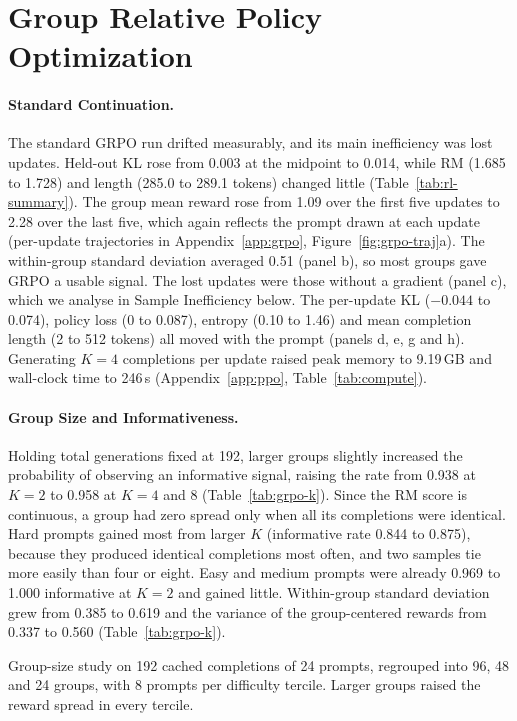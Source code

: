 \documentclass{article}
\newcommand{\tablebody}[1]{\small\setlength{\tabcolsep}{4pt}\begin{adjustbox}{max width=\linewidth}\end{adjustbox}}
\begin{document}
\section{Group Relative Policy Optimization}
\label{sec:grpo}

\paragraph{Standard Continuation.} The standard GRPO run drifted measurably, and its main inefficiency was lost updates. Held-out KL rose from 0.003 at the midpoint to 0.014, while RM (1.685 to 1.728) and length (285.0 to 289.1 tokens) changed little (Table~\ref{tab:rl-summary}). The group mean reward rose from 1.09 over the first five updates to 2.28 over the last five, which again reflects the prompt drawn at each update (per-update trajectories in Appendix~\ref{app:grpo}, Figure~\ref{fig:grpo-traj}a). The within-group standard deviation averaged 0.51 (panel b), so most groups gave GRPO a usable signal. The lost updates were those without a gradient (panel c), which we analyse in Sample Inefficiency below. The per-update KL ($-0.044$ to 0.074), policy loss (0 to 0.087), entropy (0.10 to 1.46) and mean completion length (2 to 512 tokens) all moved with the prompt (panels d, e, g and h). Generating $K = 4$ completions per update raised peak memory to 9.19\,GB and wall-clock time to 246\,s (Appendix~\ref{app:ppo}, Table~\ref{tab:compute}).

\paragraph{Group Size and Informativeness.} Holding total generations fixed at 192, larger groups slightly increased the probability of observing an informative signal, raising the rate from 0.938 at $K = 2$ to 0.958 at $K = 4$ and 8 (Table~\ref{tab:grpo-k}). Since the RM score is continuous, a group had zero spread only when all its completions were identical. Hard prompts gained most from larger $K$ (informative rate 0.844 to 0.875), because they produced identical completions most often, and two samples tie more easily than four or eight. Easy and medium prompts were already 0.969 to 1.000 informative at $K = 2$ and gained little. Within-group standard deviation grew from 0.385 to 0.619 and the variance of the group-centered rewards from 0.337 to 0.560 (Table~\ref{tab:grpo-k}).

\begin{table}[!htb]
  \centering
  \caption{Group-size study on 192 cached completions of 24 prompts, regrouped into 96, 48 and 24 groups, with 8 prompts per difficulty tercile. Larger groups raised the reward spread in every tercile.}
  \label{tab:grpo-k}
  \tablebody{tables/t3_group_size.tex}
\end{table}
\end{document}
